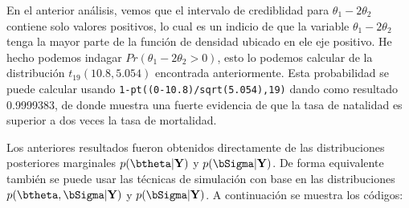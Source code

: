\begin{Eje}
En el anterior análisis, vemos que el intervalo de crediblidad para $\theta_1-2\theta_2$ contiene solo valores positivos, lo cual es un indicio de que la variable $\theta_1-2\theta_2$ tenga la mayor parte de la función de densidad ubicado en ele eje positivo. He hecho podemos indagar $Pr(\theta_1-2\theta_2>0)$, esto lo podemos calcular de la distribución $t_{19}(10.8, 5.054)$ encontrada anteriormente. Esta probabilidad se puede calcular usando \verb'1-pt((0-10.8)/sqrt(5.054),19)' dando como resultado 0.9999383, de donde muestra una fuerte evidencia de que la tasa de natalidad es superior a dos veces la tasa de mortalidad.

Los anteriores resultados fueron obtenidos directamente de las distribuciones posteriores marginales $p(\btheta|\mathbf{Y})$ y $p(\bSigma|\mathbf{Y})$. De forma equivalente también se puede usar las técnicas de simulación con base en las distribuciones $p(\btheta,\bSigma|\mathbf{Y})$ y $p(\bSigma|\mathbf{Y})$. A continuación se muestra los códigos:
\begin{knitrout}
\color{fgcolor}\begin{kframe}
\begin{alltt}
 \hlkwb{<-} \hlstd{(}\hlstd{=}\hlstd{(}\hlstd{,}\hlstd{,} \hlstd{,}\hlstd{,}\hlstd{,}\hlstd{,}\hlstd{,}\hlstd{,}\hlstd{,}\hlstd{,}\hlstd{),}
             \hlstd{=}\hlstd{(}\hlstd{,}\hlstd{,}\hlstd{,}\hlstd{,}\hlstd{,}\hlstd{,}\hlstd{,}\hlstd{,}\hlstd{,}\hlstd{,}\hlstd{),}
                \hlstd{=}\hlstd{(}\hlstd{,}\hlstd{,}\hlstd{,}\hlstd{,}\hlstd{,}\hlstd{,}\hlstd{,}\hlstd{,}\hlstd{,}\hlstd{,}\hlstd{))}
 \hlkwb{<-} \hlstd{(}\hlstd{=}\hlstd{(}\hlstd{,}\hlstd{,}\hlstd{,}\hlstd{,}\hlstd{,}\hlstd{,}\hlstd{),}
                        \hlstd{=}\hlstd{(}\hlstd{,}\hlstd{,}\hlstd{,}\hlstd{,}\hlstd{,}\hlstd{,}\hlstd{),}

\end{alltt}
\end{kframe}
\end{knitrout}
\end{Eje}
